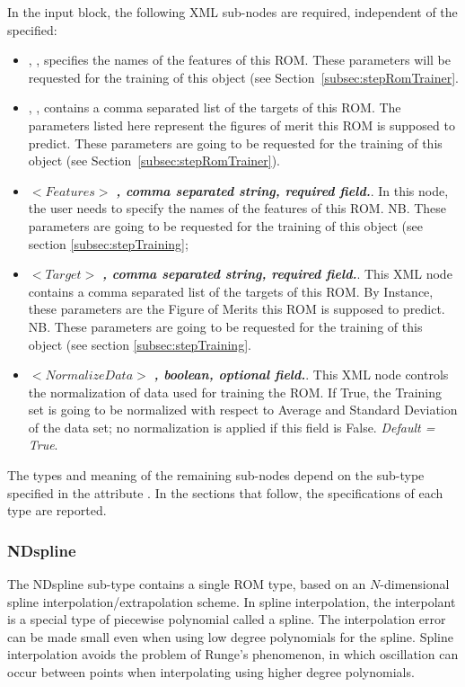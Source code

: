 In the  input block, the following XML sub-nodes are required,
independent of the  specified:
%
\begin{itemize}
  \item {}, ,
  specifies the names of the features of this ROM.
  \nb These parameters will be requested for the training of this object (see
  Section~\ref{subsec:stepRomTrainer}.
  \item {}, ,
  contains a comma separated list of the targets of this ROM.
  The parameters listed here represent the figures of merit this ROM is supposed
  to predict.
  \nb These parameters are going to be requested for the training of this object
  (see Section~\ref{subsec:stepRomTrainer}).
   \item $<Features>$ \textbf{\textit{, comma separated string, required field.}}. In this node, the user needs to specify the names of the features of this ROM. NB. These parameters are going to be requested for the training of this object (see section \ref{subsec:stepTraining};
    \item $<Target>$ \textbf{\textit{, comma separated string, required field.}}. This XML node contains a comma separated list of the targets of this ROM. By Instance, these parameters are the Figure of Merits this ROM is supposed to predict.
    \\NB. These parameters are going to be requested for the training of this object (see section \ref{subsec:stepTraining}.
    \item $<NormalizeData>$ \textbf{\textit{, boolean, optional field.}}. This XML node controls the normalization of data used for training the ROM. If True, the Training set is going to be normalized with respect to Average and Standard Deviation of the data set; no normalization is applied if this field is False. \textit{Default =  True}.
\end{itemize}

The types and meaning of the remaining sub-nodes depend on the sub-type
specified in the attribute .
%
In the sections that follow, the specifications of each type are reported.
%
\subsubsection{NDspline}
\label{subsubsec:NDspline}
The NDspline sub-type contains a single ROM type, based on an $N$-dimensional
spline interpolation/extrapolation scheme.
%
In spline interpolation, the interpolant is a special type of piecewise
polynomial called a spline.
%
The interpolation error can be made small even when using low degree polynomials
for the spline.
%
Spline interpolation avoids the problem of Runge's phenomenon, in which
oscillation can occur between points when interpolating using higher degree
polynomials.
%

